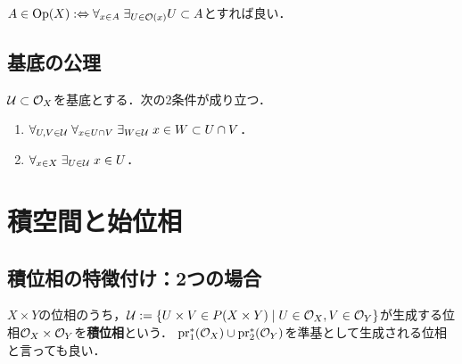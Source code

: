 \documentclass[uplatex,dvipdfmx]{jsreport}
\begin{document}
\begin{proposition}[近傍系の定める位相]
    $A\in\mathrm{Op}(X):\Leftrightarrow\forall_{x\in A}\;\exists_{U\in\mathcal{O}(x)}U\subset A$とすれば良い．
\end{proposition}

\subsection{基底の公理}

\begin{proposition}
    $\mathcal{U}\subset\mathcal{O}_X$を基底とする．次の2条件が成り立つ．
    \begin{enumerate}
        \item $\forall_{U,V\in\mathcal{U}}\;\forall_{x\in U\cap V}\;\exists_{W\in\mathcal{U}}\;x\in W\subset U\cap V$．
        \item $\forall_{x\in X}\;\exists_{U\in\mathcal{U}}\;x\in U$．
    \end{enumerate}
\end{proposition}

\section{積空間と始位相}

\subsection{積位相の特徴付け：2つの場合}

\begin{definition}
    $X\times Y$の位相のうち，$\mathcal{U}:=\left\{U\times V\in P(X\times Y)\mid U\in\mathcal{O}_X,V\in\mathcal{O}_Y\right\}$が生成する位相$\mathcal{O}_X\times\mathcal{O}_Y$を\textbf{積位相}という．
    $\mathrm{pr}_1^*(\mathcal{O}_X)\cup\mathrm{pr}_2^*(\mathcal{O}_Y)$を準基として生成される位相と言っても良い．
\end{definition}
\end{document}
